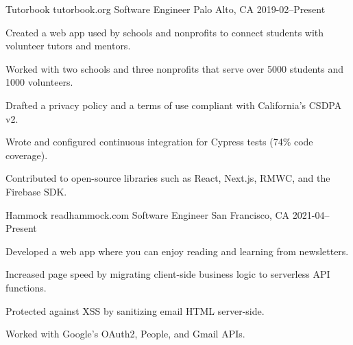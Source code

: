 

\begin{cventries}

  \cventry
    {Tutorbook} %
    {tutorbook.org} %
    {Software Engineer} %
    {Palo Alto, CA} %
    {2019-02–Present} %
    {
      \begin{cvitems} %
        \item {Created a web app used by schools and nonprofits to connect students with volunteer tutors and mentors.}
        \item {Worked with two schools and three nonprofits that serve over 5000 students and 1000 volunteers.}
        \item {Drafted a privacy policy and a terms of use compliant with California's CSDPA v2.}
        \item {Wrote and configured continuous integration for Cypress tests (74\% code coverage).}
        \item {Contributed to open-source libraries such as React, Next.js, RMWC, and the Firebase SDK.}
      \end{cvitems}
    }

  \cventry
    {Hammock} %
    {readhammock.com} %
    {Software Engineer} %
    {San Francisco, CA} %
    {2021-04–Present} %
    {
      \begin{cvitems} %
        \item {Developed a web app where you can enjoy reading and learning from newsletters.}
        \item {Increased page speed by migrating client-side business logic to serverless API functions.}
        \item {Protected against XSS by sanitizing email HTML server-side.}
        \item {Worked with Google's OAuth2, People, and Gmail APIs.}
      \end{cvitems}
    }


\end{cventries}
